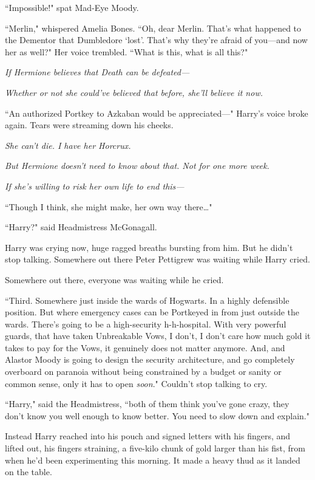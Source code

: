 ``Impossible!" spat Mad-Eye Moody.

``Merlin," whispered Amelia Bones. ``Oh, dear Merlin. That's what happened to the Dementor that Dumbledore `lost'. That's why they're afraid of you—and now her as well?" Her voice trembled. ``What is this, what is all this?"

\emph{If Hermione believes that Death can be defeated—}

\emph{Whether or not she could've believed that before, she'll believe it now.}

``An authorized Portkey to Azkaban would be appreciated—" Harry's voice broke again. Tears were streaming down his cheeks.

\emph{She can't die. I have her Horcrux.}

\emph{But Hermione doesn't need to know about that. Not for one more week.}

\emph{If she's willing to risk her own life to end this—}

``Though I think, she might make, her own way there{\ldots}"

``Harry?" said Headmistress McGonagall.

Harry was crying now, huge ragged breaths bursting from him. But he didn't stop talking. Somewhere out there Peter Pettigrew was waiting while Harry cried.

Somewhere out there, everyone was waiting while he cried.

``Third. Somewhere just inside the wards of Hogwarts. In a highly defensible position. But where emergency cases can be Portkeyed in from just outside the wards. There's going to be a high-security h-h-hospital. With very powerful guards, that have taken Unbreakable Vows, I don't, I don't care how much gold it takes to pay for the Vows, it genuinely does not matter anymore. And, and Alastor Moody is going to design the security architecture, and go completely overboard on paranoia without being constrained by a budget or sanity or common sense, only it has to open \emph{soon}." Couldn't stop talking to cry.

``Harry," said the Headmistress, ``both of them think you've gone crazy, they don't know you well enough to know better. You need to slow down and explain."

Instead Harry reached into his pouch and signed letters with his fingers, and lifted out, his fingers straining, a five-kilo chunk of gold larger than his fist, from when he'd been experimenting this morning. It made a heavy thud as it landed on the table.

